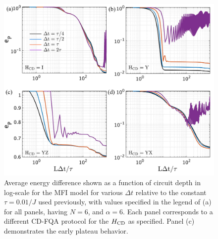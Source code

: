 \documentclass[twocolumn,aps,superscriptaddress,floatfix,longbibliography]{revtex4-2}
\begin{document}
\begin{figure}
    \centering
    \includegraphics[scale=0.11]{deltat_final.pdf}
    \caption{
    Average energy difference shown as a function of circuit depth in log-scale for the MFI model
    for %
    various $\Delta t$ relative to the constant
    $\tau = 0.01/J$ %
    used previously,
    with values specified in the legend of (a) for
    all panels, having $N=6$, and $\alpha=6$.
    Each panel %
    corresponds to a different CD-FQA protocol
    for the $H_{\rm CD}$ as specified.
    Panel (c) demonstrates the early plateau behavior.
}\label{fig:deltat_final}
\end{figure}
 
\end{document}
